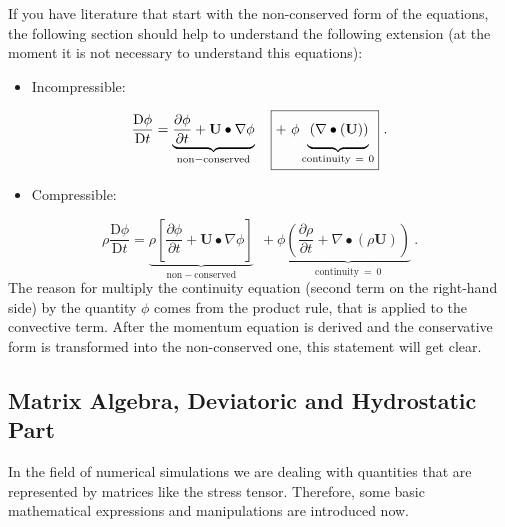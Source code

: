 \documentclass[MathematicsNumericsDerivationsAndOpenFOAM.tex]{subfiles}
\begin{document}
	If you have literature that start with the non-conserved form of the
    equations, the following section should help to understand the following
    extension (at the moment it is not necessary to understand this equations):
%
%
\begin{itemize}
    \item Incompressible:
\end{itemize}
%
%
\begin{equation}
    \frac{\mathrm{D}\phi}{\mathrm{D}t}
=
    \underbrace
    {
        \frac{\partial \phi}{\partial t}
      + \textbf{U}\bullet \nabla \phi
    }_{\mathrm{non-conserved}}
 ~~~
     \boxed
     { + ~
        \phi
        \underbrace
        {
            \vphantom{\frac{1}{2}}\left( \nabla \bullet (\textbf{U})\right)
        }_{\mathrm{continuity~=~0}}
     } ~.
\end{equation}
%
%
\begin{itemize}
    \item Compressible:
\end{itemize}
%
%
\begin{equation}
   \rho \frac{\mathrm{D}\phi}{\mathrm{D}t}
=
    \underbrace
    {
        \rho\left[\frac{\partial \phi}{\partial t}
      + \textbf{U}\bullet \nabla \phi\right]
    }_{\mathrm{non-conserved}}
 ~~~
    \boxed
    { + ~
        \phi
        \underbrace
        {
            \left( \frac{\partial \rho}{\partial t}
          + \nabla \bullet (\rho \textbf{U})\right)
        }_{\mathrm{continuity~=~0}}
    } ~.
\end{equation}
%
%
	The reason for multiply the continuity equation (second term on the
    right-hand side) by the quantity $\phi$ comes from the product rule,
    that is applied to the convective term. After the momentum equation is
    derived and the conservative form is transformed into the non-conserved
    one, this statement will get clear.
%
%
%
%
\subsection{Matrix Algebra, Deviatoric and Hydrostatic Part}
%
%
	In the field of numerical simulations we are dealing with quantities that
    are represented by matrices like the stress tensor. Therefore, some basic
    mathematical expressions and manipulations are introduced now.
\end{document}
